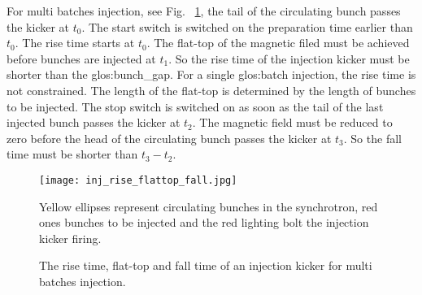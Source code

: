 For multi batches injection, see Fig. ~\ref{inj_rise_flattop_fall}, the tail of the circulating bunch passes the kicker at $t_0$. The start switch is switched on the preparation time earlier than $t_0$. The rise time starts at $t_0$.  The flat-top of the magnetic filed must be achieved before bunches are injected at $t_1$. So the rise time of the injection kicker must be shorter than the \gls{glos:bunch_gap}. For a single \gls{glos:batch} injection, the rise time is not constrained. The length of the flat-top is determined by the length of bunches to be injected. The stop switch is switched on as soon as the tail of the last injected bunch passes the kicker at $t_2$. The magnetic field must be reduced to zero before the head of the circulating bunch passes the kicker at $t_3$. So the fall time must be shorter than $t_3-t_2$.

\begin{figure}[!htb]
   \centering   
   \texttt{[image: inj\_rise\_flattop\_fall.jpg]}
   \caption{The rise time, flat-top and fall time of an injection kicker for multi batches injection.}{Yellow ellipses represent circulating bunches in the synchrotron, red ones bunches to be injected and the red lighting bolt the injection kicker firing.}
   \label{inj_rise_flattop_fall}
\end{figure}

%


%
%


